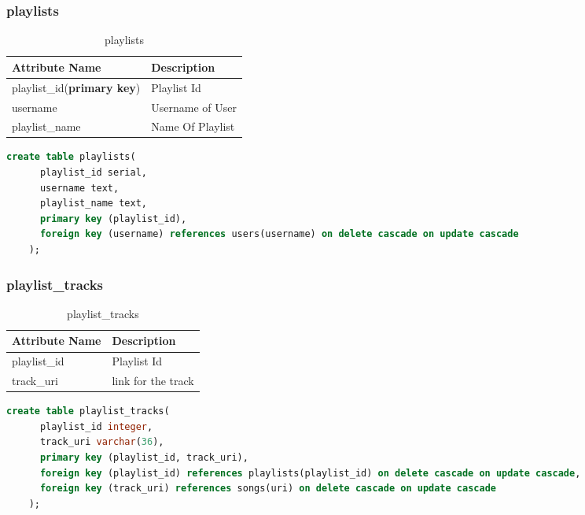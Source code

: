 \documentclass[10pt]{article}
\begin{document}
\subsubsection{playlists}
\begin{table}[!ht]
    \centering
    \begin{tabular}{|l|l|}
         \hline
         \textbf{Attribute Name} & \textbf{Description} \\
         \hline
         playlist\_id(\textbf{primary key}) & Playlist Id  \\
         \hline
         username &  Username of User\\
         \hline
         playlist\_name &  Name Of Playlist\\
         \hline
    \end{tabular}
    \caption{playlists}
    \label{tab:my_label7}
\end{table}

\begin{lstlisting}[language=SQL,
        deletekeywords={IDENTITY,INT},
        morekeywords={clustered},    
        framesep=10pt,
        framextopmargin=10pt]
    create table playlists(
      playlist_id serial,
      username text,
      playlist_name text,
      primary key (playlist_id),
      foreign key (username) references users(username) on delete cascade on update cascade
    );
\end{lstlisting}

\subsubsection{playlist\_tracks}
\begin{table}[!ht]
    \centering
    \begin{tabular}{|l|l|}
         \hline
         \textbf{Attribute Name} & \textbf{Description} \\
         \hline
         playlist\_id & Playlist Id  \\
         \hline
         track\_uri &  link for the track\\
         \hline
    \end{tabular}
    \caption{playlist\_tracks}
    \label{tab:my_label8}
\end{table}

\begin{lstlisting}[language=SQL,
        deletekeywords={IDENTITY,INT},
        morekeywords={clustered},    
        framesep=10pt,
        framextopmargin=10pt]
    create table playlist_tracks(
      playlist_id integer,
      track_uri varchar(36),
      primary key (playlist_id, track_uri),
      foreign key (playlist_id) references playlists(playlist_id) on delete cascade on update cascade,
      foreign key (track_uri) references songs(uri) on delete cascade on update cascade
    );
\end{lstlisting}
\end{document}
